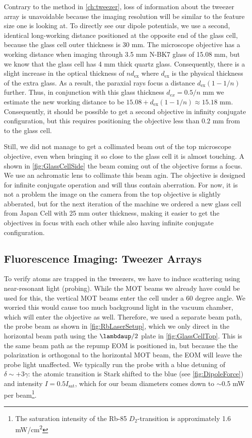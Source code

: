 Contrary to the method in \cref{ch:tweezer}, loss of information about the tweezer array is unavoidable because the imaging resolution will be similar to the feature size one is looking at.
To directly see our dipole potentials, we use a second, identical long-working distance positioned at the opposite end of the glass cell, because the glass cell outer thickness is 30 mm. 
The microscope objective has a working distance when imaging through 3.5 mm N-BK7 glass of 15.08 mm, but we know that the glass cell has 4 mm thick quartz glass.
Consequently, there is a slight increase in the optical thickness of $n d_{\text{ex}}$ where $d_{\text{ex}}$ is the physical thickness of the extra glass.
As a result, the paraxial rays focus a distance $d_{\text{ex}}(1-1/n)$ further.
Thus, in conjunction with this glass thickness $d_{ex} = 0.5/n$ mm we estimate the new working distance to be $15.08 + d_{\text{ex}}(1-1/n) \approx 15.18$ mm.
Consequently, it should be possible to get a second objective in infinity conjugate configuration, but this requires positioning the objective less than $0.2$ mm from to the glass cell.

Still, we did not manage to get a collimated beam out of the top microscope objective, even when bringing it so close to the glass cell it is almost touching. 
A shown in \cref{fig:GlassCellSide} the beam coming out of the objective forms a focus.
We use an achromatic lens to collimate this beam agin.
The objective is designed for infinite conjugate operation and will thus contain aberration. 
For now, it is not a problem the image on the camera from the top objective is slightly abberated, but for the next iteration of the machine we ordered a new glass cell from Japan Cell with 25 mm outer thickness, making it easier to get the objectives in focus with each other while also having infinite conjugate configuration.

\subsection{Fluorescence Imaging: Tweezer Arrays}


To verify atoms are trapped in the tweezers, we have to induce scattering using near-resonant light (probing). 
While the MOT beams we already have could be used for this, the vertical MOT beams enter the cell under a 60 degree angle.
We worried this would cause too much background light in the vacuum chamber, which will enter the objective as well. 
Therefore, we used a separate beam path, the probe beam as shown in \cref{fig:RbLaserSetup}, which we only direct in the horizontal beam path using the $\lambdaup/2$ plate in \cref{fig:GlassCellTop}.
This is the same beam path as the repump EOM is positioned in, but because the the polarization is orthogonal to the horizontal MOT beam, the EOM will leave the probe light unaffected. 
We typically run the probe with a blue detuning of $\delta \sim +3\gamma$: the atomic transition is Stark shifted to the blue (see \cref{fig:DipoleForce}) and intensity $I = 0.5 I_{\text{sat}}$, which for our beam diameters comes down to $\sim0.$5 mW per beam\footnote{The saturation intensity of the Rb-85 $D_2$-transition is approximately 1.6 mW/cm\textsuperscript{2}}. 

